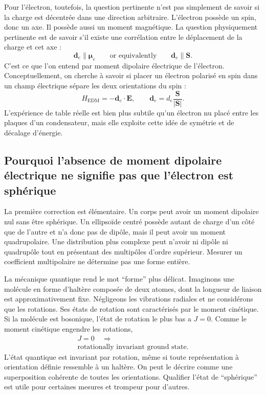 Pour l’électron, toutefois, la question pertinente n’est pas simplement de savoir si la charge est décentrée dans une direction arbitraire. L’électron possède un spin, donc un axe. Il possède aussi un moment magnétique. La question physiquement pertinente est de savoir s’il existe une corrélation entre le déplacement de la charge et cet axe : \begin{equation}
\mathbf d_e \parallel \boldsymbol{\mu}_e
\qquad \text{or equivalently} \qquad
\mathbf d_e \parallel \mathbf S .
\end{equation}C’est ce que l’on entend par moment dipolaire électrique de l’électron. Conceptuellement, on cherche à savoir si placer un électron polarisé en spin dans un champ électrique sépare les deux orientations du spin : \begin{equation}
H_{\mathrm{EDM}}=-\mathbf d_e\cdot \mathbf E,
\qquad
\mathbf d_e=d_e\frac{\mathbf S}{|\mathbf S|}.
\end{equation}L’expérience de table réelle est bien plus subtile qu’un électron nu placé entre les plaques d’un condensateur, mais elle exploite cette idée de symétrie et de décalage d’énergie.

\subsection{Pourquoi l’absence de moment dipolaire électrique ne signifie pas que l’électron est sphérique}

La première correction est élémentaire. Un corps peut avoir un moment dipolaire nul sans être sphérique. Un ellipsoïde centré possède autant de charge d’un côté que de l’autre et n’a donc pas de dipôle, mais il peut avoir un moment quadrupolaire. Une distribution plus complexe peut n’avoir ni dipôle ni quadrupôle tout en présentant des multipôles d’ordre supérieur. Mesurer un coefficient multipolaire ne détermine pas une forme entière.

La mécanique quantique rend le mot ``forme'' plus délicat. Imaginons une molécule en forme d’haltère composée de deux atomes, dont la longueur de liaison est approximativement fixe. Négligeons les vibrations radiales et ne considérons que les rotations. Ses états de rotation sont caractérisés par le moment cinétique. Si la molécule est bosonique, l’état de rotation le plus bas a \(J=0\). Comme le moment cinétique engendre les rotations, \begin{equation}
\begin{gathered}
J=0 \quad\Longrightarrow\\
\text{rotationally invariant ground state.}
\end{gathered}
\end{equation}L’état quantique est invariant par rotation, même si toute représentation à orientation définie ressemble à un haltère. On peut le décrire comme une superposition cohérente de toutes les orientations. Qualifier l’état de ``sphérique'' est utile pour certaines mesures et trompeur pour d’autres.

